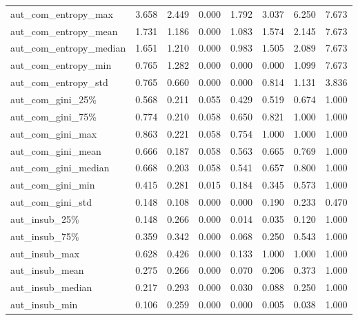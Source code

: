 \begin{table}
\begin{tabular}{lrrrrrrr}
aut\_com\_entropy\_max    &     3.658 &      2.449 & 0.000 &  1.792 &   3.037 &     6.250 &       7.673 \\
aut\_com\_entropy\_mean   &     1.731 &      1.186 & 0.000 &  1.083 &   1.574 &     2.145 &       7.673 \\
aut\_com\_entropy\_median &     1.651 &      1.210 & 0.000 &  0.983 &   1.505 &     2.089 &       7.673 \\
aut\_com\_entropy\_min    &     0.765 &      1.282 & 0.000 &  0.000 &   0.000 &     1.099 &       7.673 \\
aut\_com\_entropy\_std    &     0.765 &      0.660 & 0.000 &  0.000 &   0.814 &     1.131 &       3.836 \\
aut\_com\_gini\_25\%       &     0.568 &      0.211 & 0.055 &  0.429 &   0.519 &     0.674 &       1.000 \\
aut\_com\_gini\_75\%       &     0.774 &      0.210 & 0.058 &  0.650 &   0.821 &     1.000 &       1.000 \\
aut\_com\_gini\_max       &     0.863 &      0.221 & 0.058 &  0.754 &   1.000 &     1.000 &       1.000 \\
aut\_com\_gini\_mean      &     0.666 &      0.187 & 0.058 &  0.563 &   0.665 &     0.769 &       1.000 \\
aut\_com\_gini\_median    &     0.668 &      0.203 & 0.058 &  0.541 &   0.657 &     0.800 &       1.000 \\
aut\_com\_gini\_min       &     0.415 &      0.281 & 0.015 &  0.184 &   0.345 &     0.573 &       1.000 \\
aut\_com\_gini\_std       &     0.148 &      0.108 & 0.000 &  0.000 &   0.190 &     0.233 &       0.470 \\
aut\_insub\_25\%          &     0.148 &      0.266 & 0.000 &  0.014 &   0.035 &     0.120 &       1.000 \\
aut\_insub\_75\%          &     0.359 &      0.342 & 0.000 &  0.068 &   0.250 &     0.543 &       1.000 \\
aut\_insub\_max          &     0.628 &      0.426 & 0.000 &  0.133 &   1.000 &     1.000 &       1.000 \\
aut\_insub\_mean         &     0.275 &      0.266 & 0.000 &  0.070 &   0.206 &     0.373 &       1.000 \\
aut\_insub\_median       &     0.217 &      0.293 & 0.000 &  0.030 &   0.088 &     0.250 &       1.000 \\
aut\_insub\_min          &     0.106 &      0.259 & 0.000 &  0.000 &   0.005 &     0.038 &       1.000 \\

\end{tabular}
\end{table}
